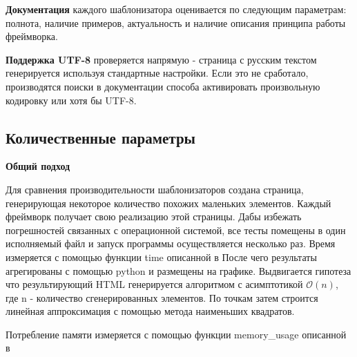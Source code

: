 \textbf{Документация} каждого шаблонизатора оценивается по следующим параметрам: полнота, наличие примеров, актуальность и наличие описания принципа работы фреймворка.

\textbf{Поддержка UTF-8} проверяется напрямую - страница с русским текстом генерируется используя стандартные настройки.
Если это не сработало, производятся поиски в документации способа активировать произвольную кодировку или хотя бы UTF-8.

\subsection{Количественные параметры}

\textbf{Общий подход}

Для сравнения производительности шаблонизаторов создана страница, генерирующая некоторое количество похожих маленьких элементов.
Каждый фреймворк получает свою реализацию этой страницы.
Дабы избежать погрешностей связанных с операционной системой, все тесты помещены в один исполняемый файл и запуск программы осуществляется несколько раз.
Время измеряется с помощью функции time описанной в %
После чего результаты агрегированы с помощью python и размещены на графике.
Выдвигается гипотеза что результирующий HTML генерируется алгоритмом с асимптотикой $\mathcal{O}(n)$, где n - количество сгенерированных элементов.
По точкам затем строится линейная аппроксимация с помощью метода наименьших квадратов.

Потребление памяти измеряется с помощью функции memory\_usage описанной в %

